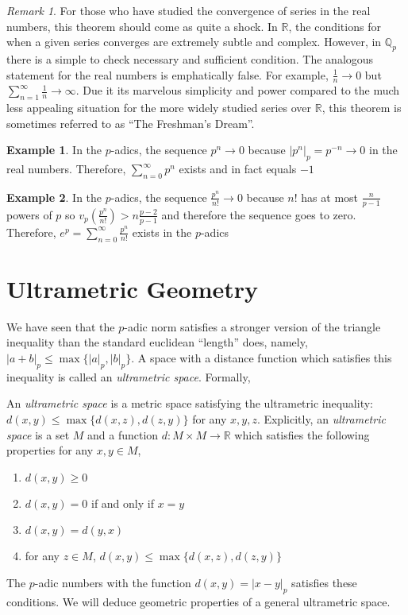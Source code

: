 \documentclass{article}
\newcommand{\Q}{\mathbb{Q}}
\newcommand{\R}{\mathbb{R}}
\newenvironment{definition}[1][Definition:]{\begin{trivlist}
\item[\hskip \labelsep {\bfseries #1}]}{\end{trivlist}}
\theoremstyle{theorem}
\theoremstyle{definition}
\theoremstyle{definition}
\theoremstyle{remark}
\theoremstyle{definition}
\newtheorem{example}{Example}[section]
\theoremstyle{remark}
\newtheorem{remark}{Remark}[subsection]
\begin{document}
\begin{remark}
For those who have studied the convergence of series in the real numbers, this theorem should come as quite a shock. In $\R$, the conditions for when a given series converges are extremely subtle and complex. However, in $\Q_p$ there is a simple to check necessary and sufficient condition. The analogous statement for the real numbers is emphatically false. For example, $\frac{1}{n} \to 0$ but $\sum\limits_{n = 1}^\infty \frac{1}{n} \to \infty$. Due it its marvelous simplicity and power compared to the much less appealing situation for the more widely studied series over $\R$, this theorem is sometimes referred to as ``The Freshman's Dream''.
\end{remark}

\begin{example} 
In the $p$-adics, the sequence $p^n \to 0$ because $|p^n|_p = p^{-n} \to 0$ in the real numbers. Therefore, $\sum\limits_{n = 0}^\infty p^n$ exists and in fact equals $-1$ 
\end{example}

\begin{example} 
In the $p$-adics, the sequence $\frac{p^n}{n!} \to 0$ because $n!$ has at most $\frac{n}{p-1}$ powers of $p$ so $v_p(\frac{p^n}{n!}) > n \frac{p-2}{p-1}$ and therefore the sequence goes to zero. Therefore, $e^p = \sum\limits_{n = 0}^\infty \frac{p^n}{n!}$ exists in the $p$-adics
\end{example}

\section{Ultrametric Geometry}
We have seen that the $p$-adic norm satisfies a stronger version of the triangle inequality than the standard euclidean ``length'' does, namely, $|a + b|_p \le \max\{|a|_p, |b|_p\}$. A space with a distance function which satisfies this inequality is called an 
\textit{ultrametric space}. Formally,

\begin{definition}
An \textit{ultrametric space} is a metric space satisfying the ultrametric inequality: $d(x,y) \le \max\{d(x,z), d(z,y)\}$ for any $x,y,z$. Explicitly, an \textit{ultrametric space} is a set $M$ and a function $d : M \times M \to \R$ which satisfies the following properties for any $x,y \in M$,
\begin{enumerate}
\item $d(x,y) \ge 0$
\item $d(x, y) = 0$ if and only if $x = y$
\item $d(x, y) = d(y, x)$
\item for any $z \in M$, $d(x,y) \le \max\{d(x,z), d(z,y)\}$
\end{enumerate}
\end{definition} 
\bigskip 
The $p$-adic numbers with the function $d(x,y) = |x-y|_p$ satisfies these conditions. We will deduce geometric properties of a general ultrametric space.  
  
\end{document}
